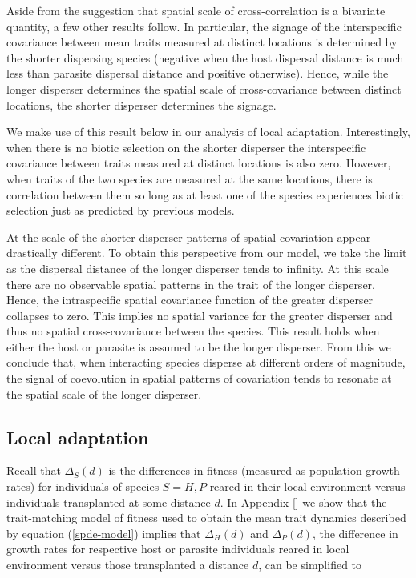 \documentclass{article}
\begin{document}
Aside from the suggestion that spatial scale of cross-correlation is a
bivariate quantity, a few other results follow. In particular, the
signage of the interspecific covariance between mean traits measured at
distinct locations is determined by the shorter dispersing species
(negative when the host dispersal distance is much less than parasite
dispersal distance and positive otherwise). Hence, while the longer
disperser determines the spatial scale of cross-covariance between
distinct locations, the shorter disperser determines the signage.

We make use of this result below in our analysis of local adaptation.
Interestingly, when there is no biotic selection on the shorter
disperser the interspecific covariance between traits measured at
distinct locations is also zero. However, when traits of the two species
are measured at the same locations, there is correlation between them so
long as at least one of the species experiences biotic selection just as
predicted by previous models.

At the scale of the shorter disperser patterns of spatial covariation
appear drastically different. To obtain this perspective from our model,
we take the limit as the dispersal distance of the longer disperser
tends to infinity. At this scale there are no observable spatial
patterns in the trait of the longer disperser. Hence, the intraspecific
spatial covariance function of the greater disperser collapses to zero.
This implies no spatial variance for the greater disperser and thus no
spatial cross-covariance between the species. This result holds when
either the host or parasite is assumed to be the longer disperser. From
this we conclude that, when interacting species disperse at different
orders of magnitude, the signal of coevolution in spatial patterns of
covariation tends to resonate at the spatial scale of the longer
disperser.

\hypertarget{local-adaptation}{%
\subsection{Local adaptation}\label{local-adaptation}}

Recall that \(\Delta_S(d)\) is the differences in fitness (measured as
population growth rates) for individuals of species \(S=H,P\) reared in
their local environment versus individuals transplanted at some distance
\(d\). In Appendix \ref{} we show that the trait-matching model of
fitness used to obtain the mean trait dynamics described by equation
(\ref{spde-model}) implies that \(\Delta_H(d)\) and \(\Delta_P(d)\), the
difference in growth rates for respective host or parasite individuals
reared in local environment versus those transplanted a distance \(d\),
can be simplified to
\end{document}
